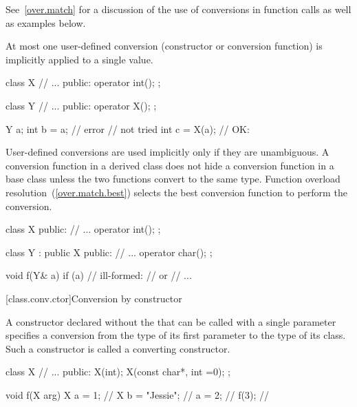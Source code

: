 \pnum
\enternote
See~\ref{over.match} for a discussion of the use of conversions in function calls
as well as examples below.
\exitnote

\pnum
{}%
At most one user-defined conversion (constructor or conversion function)
is implicitly applied to a single value.
\enterexample

\begin{codeblock}
class X {
    // ...
public:
    operator int();
};

class Y {
    // ...
public:
    operator X();
};

Y a;
int b = a;			// error
				//  not tried
int c = X(a);			// OK: 
\end{codeblock}
\exitexampleb

\pnum
User-defined conversions are used implicitly only if they are unambiguous.
%
A conversion function in a derived class does not hide a conversion function
in a base class unless the two functions convert to the same type.
Function overload resolution~(\ref{over.match.best}) selects the best
conversion function to perform the conversion.
\enterexample

\begin{codeblock}
class X {
public:
    // ...
    operator int();
};

class Y : public X {
public:
    // ...
    operator char();
};

void f(Y& a)
{
    if (a) {			// ill-formed:
				//  or 
				// ...
    }
}
\end{codeblock}
\exitexampleb

[class.conv.ctor]{Conversion by constructor}%

\pnum
A constructor declared without the
that can be called with a single parameter
specifies a conversion from
the type of its first parameter
to the type of its class.
Such a constructor is called a
%
converting constructor.
\enterexample

%
\begin{codeblock}
class X {
    // ...
public:
    X(int);
    X(const char*, int =0);
};

void f(X arg)
{
    X a = 1;			// 
    X b = "Jessie";		// 
    a = 2;			// 
    f(3);			// 
}
\end{codeblock}
\exitexampleb

